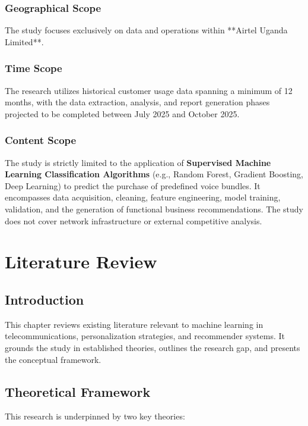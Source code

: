 \documentclass[12pt, a4paper]{report}
\begin{document}
\subsection{Geographical Scope}
The study focuses exclusively on data and operations within **Airtel Uganda Limited**.
\subsection{Time Scope}
The research utilizes historical customer usage data spanning a minimum of 12 months, with the data extraction, analysis, and report generation phases projected to be completed between July 2025 and October 2025.
\subsection{Content Scope}
The study is strictly limited to the application of \textbf{Supervised Machine Learning Classification Algorithms} (e.g., Random Forest, Gradient Boosting, Deep Learning) to predict the purchase of predefined voice bundles. It encompasses data acquisition, cleaning, feature engineering, model training, validation, and the generation of functional business recommendations. The study does not cover network infrastructure or external competitive analysis.

\clearpage

\chapter{Literature Review}
\label{ch:litreview}

\section{Introduction}
This chapter reviews existing literature relevant to machine learning in telecommunications, personalization strategies, and recommender systems. It grounds the study in established theories, outlines the research gap, and presents the conceptual framework.

\section{Theoretical Framework}
This research is underpinned by two key theories:
\end{document}
